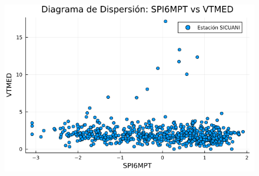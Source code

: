 \begin{figure}[htbp]
\begin{minipage}{0.32\textwidth}
    \includegraphics[width=\linewidth]{Capitulos/Scaterplot/SICUANI_SPI6MPT_vs_VTMED.png}
\end{minipage}

\vspace{0.5cm}  %


\end{figure}
